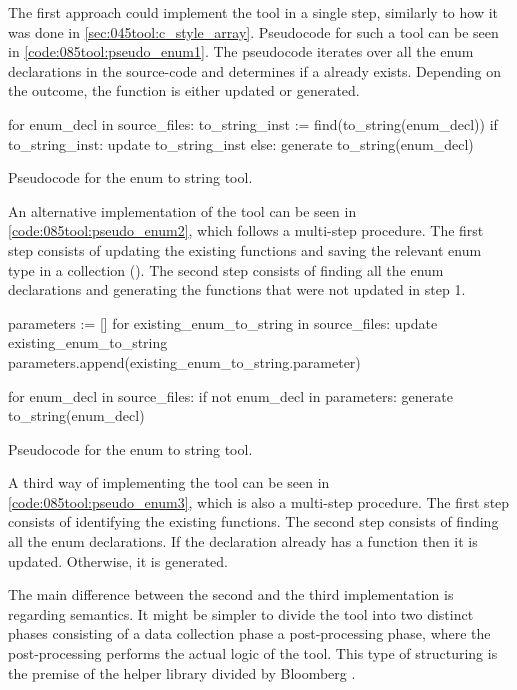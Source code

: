 The first approach could implement the tool in a single step, similarly to how it was done in \cref{sec:045tool:c_style_array}. Pseudocode for such a tool can be seen in \cref{code:085tool:pseudo_enum1}. The pseudocode iterates over all the enum declarations in the source-code and determines if a  already exists. Depending on the outcome, the function is either updated or generated.

\begin{listing}[H]
    \begin{pythoncode}
for enum_decl in source_files:
    to_string_inst := find(to_string(enum_decl))
    if to_string_inst:
        update to_string_inst
    else:
        generate to_string(enum_decl)
    \end{pythoncode}
    \caption{Pseudocode for the enum to string tool.}
    \label{code:085tool:pseudo_enum1}
\end{listing}

An alternative implementation of the tool can be seen in \cref{code:085tool:pseudo_enum2}, which follows a multi-step procedure. The first step consists of updating the existing  functions and saving the relevant enum type in a collection (). The second step consists of finding all the enum declarations and generating the  functions that were not updated in step 1.

\begin{listing}[H]
    \begin{pythoncode}
parameters := []
for existing_enum_to_string in source_files:
    update existing_enum_to_string
    parameters.append(existing_enum_to_string.parameter)

for enum_decl in source_files:
    if not enum_decl in parameters:
        generate to_string(enum_decl)
    \end{pythoncode}
    \caption{Pseudocode for the enum to string tool.}
    \label{code:085tool:pseudo_enum2}
\end{listing}

A third way of implementing the tool can be seen in \cref{code:085tool:pseudo_enum3}, which is also a multi-step procedure. The first step consists of identifying the existing  functions. The second step consists of finding all the enum declarations. If the declaration already has a  function then it is updated. Otherwise, it is generated.

The main difference between the second and the third implementation is regarding semantics. It might be simpler to divide the tool into two distinct phases consisting of a data collection phase a post-processing phase, where the post-processing performs the actual logic of the tool. This type of structuring is the premise of the helper library divided by Bloomberg \cite{ClangmetatoolFrameworkReusing2023}.

